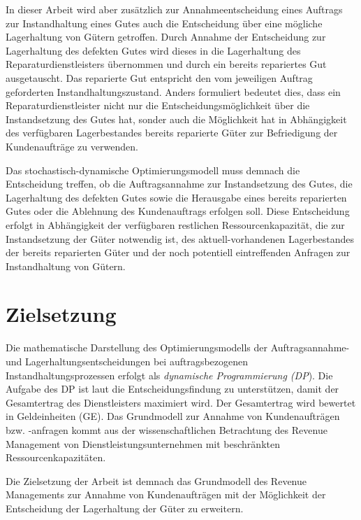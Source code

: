 In dieser Arbeit wird aber zusätzlich zur Annahmeentscheidung eines Auftrags zur Instandhaltung eines Gutes auch die Entscheidung über eine mögliche Lagerhaltung von Gütern getroffen. Durch Annahme der Entscheidung zur Lagerhaltung des defekten Gutes wird dieses in die Lagerhaltung des Reparaturdienstleisters übernommen und durch ein bereits repariertes Gut ausgetauscht. Das reparierte Gut entspricht den vom jeweiligen Auftrag geforderten Instandhaltungszustand. Anders formuliert bedeutet dies, dass ein Reparaturdienstleister nicht nur die Entscheidungsmöglichkeit über die Instandsetzung des Gutes hat, sonder auch die Möglichkeit hat in Abhängigkeit des verfügbaren Lagerbestandes bereits reparierte Güter zur Befriedigung der Kundenaufträge zu verwenden.

Das stochastisch-dynamische Optimierungsmodell muss demnach die Entscheidung treffen, ob die Auftragsannahme zur Instandsetzung des Gutes, die Lagerhaltung des defekten Gutes sowie die Herausgabe eines bereits reparierten Gutes oder die Ablehnung des Kundenauftrags erfolgen soll. Diese Entscheidung erfolgt in Abhängigkeit der verfügbaren restlichen Ressourcenkapazität, die zur Instandsetzung der Güter notwendig ist, des aktuell-vorhandenen Lagerbestandes der bereits reparierten Güter und der noch potentiell eintreffenden Anfragen zur Instandhaltung von Gütern.

\section{Zielsetzung}

Die mathematische Darstellung des Optimierungsmodells der Auftragsannahme- und Lagerhaltungsentscheidungen bei auftragsbezogenen Instandhaltungsprozessen erfolgt als \textit{dynamische Programmierung (DP}).
Die Aufgabe des DP ist laut \cite{talluri2004theory} die Entscheidungsfindung zu unterstützen, damit der Gesamtertrag des Dienstleisters maximiert wird. Der Gesamtertrag wird bewertet in Geldeinheiten (GE). 
Das Grundmodell zur Annahme von Kundenaufträgen bzw. -anfragen kommt aus der wissenschaftlichen Betrachtung des Revenue Management von Dienstleistungsunternehmen mit beschränkten Ressourcenkapazitäten.

Die Zielsetzung der Arbeit ist demnach das Grundmodell des Revenue Managements zur Annahme von Kundenaufträgen mit der Möglichkeit der Entscheidung der Lagerhaltung der Güter zu erweitern.


